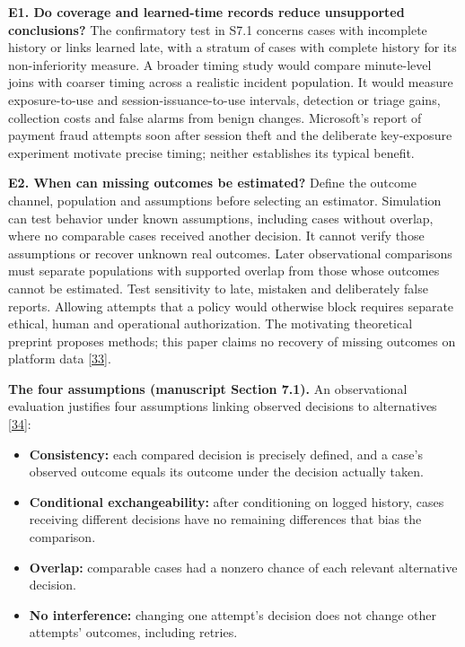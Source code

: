 \documentclass[
  11pt,
]{article}
\providecommand{\tightlist}{%
  \setlength{\itemsep}{0pt}\setlength{\parskip}{0pt}}
\renewcommand{\tightlist}{\setlength{\itemsep}{0pt plus 1pt}\setlength{\parskip}{0pt}}
\begin{document}
\begin{table}[tp]
{\begin{tabular}
\bottomrule\noalign{}
\end{tabular}
}
\end{table}

\textbf{E1. Do coverage and learned-time records reduce unsupported
conclusions?} The confirmatory test in S7.1 concerns cases with
incomplete history or links learned late, with a stratum of cases with
complete history for its non-inferiority measure. A broader timing study
would compare minute-level joins with coarser timing across a realistic
incident population. It would measure exposure-to-use and
session-issuance-to-use intervals, detection or triage gains, collection
costs and false alarms from benign changes. Microsoft's report of
payment fraud attempts soon after session theft and the deliberate
key-exposure experiment motivate precise timing; neither establishes its
typical benefit.

\textbf{E2. When can missing outcomes be estimated?} Define the outcome
channel, population and assumptions before selecting an estimator.
Simulation can test behavior under known assumptions, including cases
without overlap, where no comparable cases received another decision. It
cannot verify those assumptions or recover unknown real outcomes. Later
observational comparisons must separate populations with supported
overlap from those whose outcomes cannot be estimated. Test sensitivity
to late, mistaken and deliberately false reports. Allowing attempts that
a policy would otherwise block requires separate ethical, human and
operational authorization. The motivating theoretical preprint proposes
methods; this paper claims no recovery of missing outcomes on platform
data {[}\protect\hyperlink{ref-Dhama2026Causal}{33}{]}.

\textbf{The four assumptions (manuscript Section 7.1).} An observational
evaluation justifies four assumptions linking observed decisions to
alternatives {[}\protect\hyperlink{ref-HernanRobins2020}{34}{]}:

\begin{itemize}
\tightlist
\item
  \textbf{Consistency:} each compared decision is precisely defined, and
  a case's observed outcome equals its outcome under the decision
  actually taken.
\item
  \textbf{Conditional exchangeability:} after conditioning on logged
  history, cases receiving different decisions have no remaining
  differences that bias the comparison.
\item
  \textbf{Overlap:} comparable cases had a nonzero chance of each
  relevant alternative decision.
\item
  \textbf{No interference:} changing one attempt's decision does not
  change other attempts' outcomes, including retries.
\end{itemize}
\end{document}

